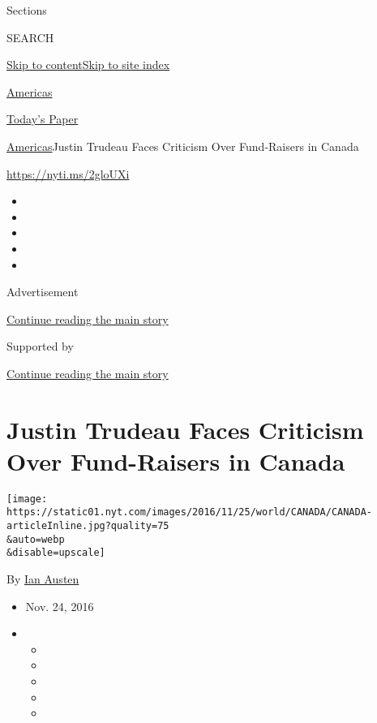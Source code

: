 Sections

SEARCH

\protect\hyperlink{site-content}{Skip to
content}\protect\hyperlink{site-index}{Skip to site index}

\href{https://www.nytimes.com/section/world/americas}{Americas}

\href{https://myaccount.nytimes.com/auth/login?response_type=cookie\&client_id=vi}{}

\href{https://www.nytimes.com/section/todayspaper}{Today's Paper}

\href{/section/world/americas}{Americas}\textbar{}Justin Trudeau Faces
Criticism Over Fund-Raisers in Canada

\url{https://nyti.ms/2gloUXi}

\begin{itemize}
\item
\item
\item
\item
\item
\end{itemize}

Advertisement

\protect\hyperlink{after-top}{Continue reading the main story}

Supported by

\protect\hyperlink{after-sponsor}{Continue reading the main story}

\hypertarget{justin-trudeau-faces-criticism-over-fund-raisers-in-canada}{%
\section{Justin Trudeau Faces Criticism Over Fund-Raisers in
Canada}\label{justin-trudeau-faces-criticism-over-fund-raisers-in-canada}}

\texttt{[image: https://static01.nyt.com/images/2016/11/25/world/CANADA/CANADA-articleInline.jpg?quality=75\\\&auto=webp\\\&disable=upscale]}

By \href{http://www.nytimes.com/by/ian-austen}{Ian Austen}

\begin{itemize}
\item
  Nov. 24, 2016
\item
  \begin{itemize}
  \item
  \item
  \item
  \item
  \item
  \end{itemize}
\end{itemize}

